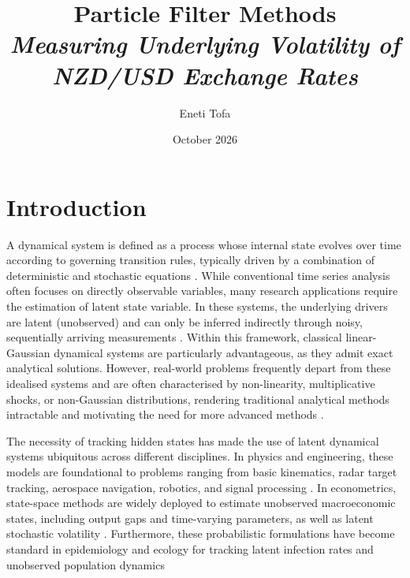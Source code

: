 \documentclass[10pt, a4paper]{article}
\title{
    Particle Filter Methods\\[0.5em]
    \large\itshape Measuring Underlying Volatility of NZD/USD Exchange Rates
}
\author{Eneti Tofa}
\date{October 2026}
\numberwithin{equation}{section}
\begin{document}
\maketitle
\thispagestyle{empty}
\newpage
\thispagestyle{empty}
\null{}
\newpage
\setcounter{page}{1}

\onehalfspacing{}

\section{Introduction}
A dynamical system is defined as a process whose internal state evolves over time according to governing transition rules, typically driven by a combination of deterministic and stochastic equations \parencite{Sarkka2013}. While conventional time series analysis often focuses on directly observable variables, many research applications require the estimation of latent state variable. In these systems, the underlying drivers are latent (unobserved) and can only be inferred indirectly through noisy, sequentially arriving measurements \parencite{Durbin2012}. Within this framework, classical linear-Gaussian dynamical systems are particularly advantageous, as they admit exact analytical solutions. However, real-world problems frequently depart from these idealised systems and are often characterised by non-linearity, multiplicative shocks, or non-Gaussian distributions, rendering traditional analytical methods intractable and motivating the need for more advanced methods \parencite{Arulampalam2002}. 

The necessity of tracking hidden states has made the use of latent dynamical systems ubiquitous across different disciplines. In physics and engineering, these models are foundational to problems ranging from basic kinematics, radar target tracking, aerospace navigation, robotics, and signal processing \parencite{Gustafsson2002, Sarkka2013}. In econometrics, state-space methods are widely deployed to estimate unobserved macroeconomic states, including output gaps and time-varying parameters, as well as latent stochastic volatility \parencite{Kim1998, Durbin2012}. Furthermore, these probabilistic formulations have become standard in epidemiology and ecology for tracking latent infection rates and unobserved population dynamics \parencite{BUCKLAND2004157, Dukic01122012} 
\end{document}
